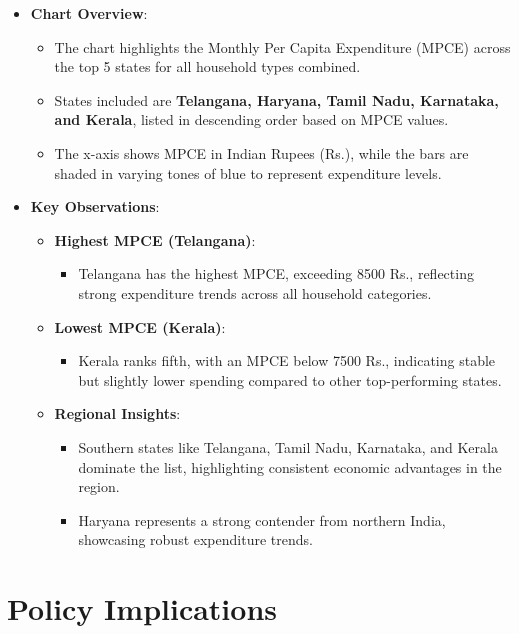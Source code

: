 \documentclass{article}
\begin{document}
\begin{itemize}
	\item \textbf{Chart Overview}:
	\begin{itemize}
		\item The chart highlights the Monthly Per Capita Expenditure (MPCE) across the top 5 states for all household types combined.
		\item States included are \textbf{Telangana, Haryana, Tamil Nadu, Karnataka, and Kerala}, listed in descending order based on MPCE values.
		\item The x-axis shows MPCE in Indian Rupees (Rs.), while the bars are shaded in varying tones of blue to represent expenditure levels.
	\end{itemize}
	\item \textbf{Key Observations}:
	\begin{itemize}
		\item \textbf{Highest MPCE (Telangana)}:
		\begin{itemize}
			\item Telangana has the highest MPCE, exceeding 8500 Rs., reflecting strong expenditure trends across all household categories.
		\end{itemize}
		\item \textbf{Lowest MPCE (Kerala)}:
		\begin{itemize}
			\item Kerala ranks fifth, with an MPCE below 7500 Rs., indicating stable but slightly lower spending compared to other top-performing states.
		\end{itemize}
		\item \textbf{Regional Insights}:
		\begin{itemize}
			\item Southern states like Telangana, Tamil Nadu, Karnataka, and Kerala dominate the list, highlighting consistent economic advantages in the region.
			\item Haryana represents a strong contender from northern India, showcasing robust expenditure trends.
		\end{itemize}
	\end{itemize}
\end{itemize}

\section*{Policy Implications}
\end{document}
